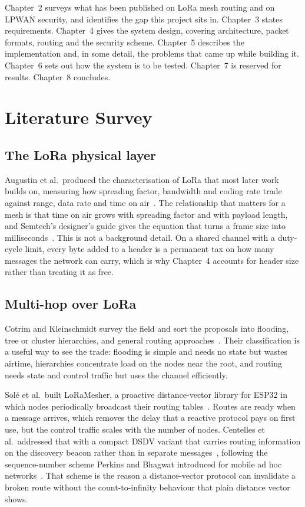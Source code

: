 \documentclass[12pt,a4paper,oneside]{report}
\begin{document}
Chapter~2 surveys what has been published on LoRa mesh routing and on LPWAN
security, and identifies the gap this project sits in. Chapter~3 states
requirements. Chapter~4 gives the system design, covering architecture, packet
formats, routing and the security scheme. Chapter~5 describes the implementation
and, in some detail, the problems that came up while building it. Chapter~6 sets
out how the system is to be tested. Chapter~7 is reserved for results.
Chapter~8 concludes.

\chapter{Literature Survey}

\section{The LoRa physical layer}

Augustin et al.\ produced the characterisation of LoRa that most later work
builds on, measuring how spreading factor, bandwidth and coding rate trade
against range, data rate and time on air~\cite{augustin2016lora}. The
relationship that matters for a mesh is that time on air grows with spreading
factor and with payload length, and Semtech's designer's guide gives the
equation that turns a frame size into
milliseconds~\cite{semtech2013toa}. This is not a background detail. On a shared
channel with a duty-cycle limit, every byte added to a header is a permanent tax
on how many messages the network can carry, which is why Chapter~4 accounts for
header size rather than treating it as free.

\section{Multi-hop over LoRa}

Cotrim and Kleinschmidt survey the field and sort the proposals into flooding,
tree or cluster hierarchies, and general routing approaches~\cite{cotrim2020lorawan}.
Their classification is a useful way to see the trade: flooding is simple and
needs no state but wastes airtime, hierarchies concentrate load on the nodes near
the root, and routing needs state and control traffic but uses the channel
efficiently.

Solé et al.\ built LoRaMesher, a proactive distance-vector library for ESP32 in
which nodes periodically broadcast their routing tables~\cite{sole2022loramesher}.
Routes are ready when a message arrives, which removes the delay that a reactive
protocol pays on first use, but the control traffic scales with the number of
nodes. Centelles et al.\ addressed that with a compact DSDV variant that carries
routing information on the discovery beacon rather than in separate
messages~\cite{centelles2024dsdv}, following the sequence-number scheme Perkins
and Bhagwat introduced for mobile ad hoc networks~\cite{perkins1994dsdv}. That
scheme is the reason a distance-vector protocol can invalidate a broken route
without the count-to-infinity behaviour that plain distance vector shows.
\end{document}
